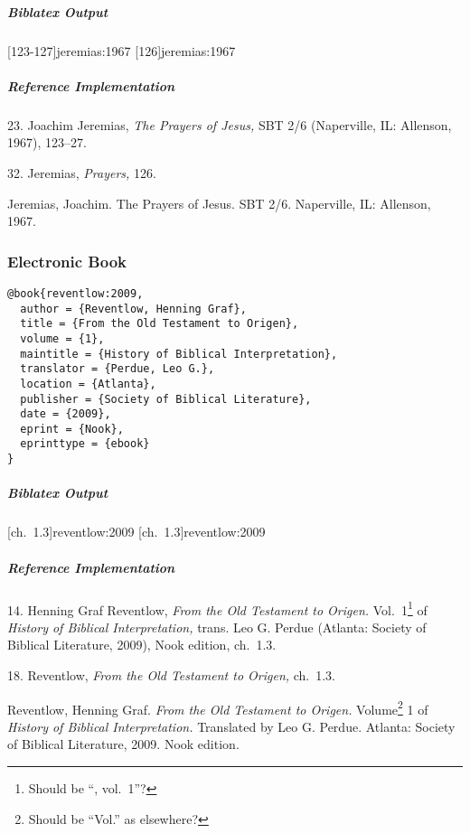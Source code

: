 \documentclass[a4paper]{article}
\newenvironment{biboutput}{%
  \subparagraph{Biblatex Output}
}{\color{black}}
\newenvironment{refimp}{%
  \subparagraph{Reference Implementation}
  \color{reference-colour}
  \rm
}{\par\color{black}}
\begin{document}
\begin{biboutput}
  [123-127]{jeremias:1967}
  [126]{jeremias:1967}
\end{biboutput}

\begin{refimp}
  23. Joachim Jeremias, \emph{The Prayers of Jesus,} SBT 2/6 (Naperville, IL:
  Allenson, 1967), 123–27.

  32. Jeremias, \emph{Prayers,} 126.

  \hangindent\bibindent Jeremias, Joachim. The Prayers of Jesus. SBT 2/6.
  Naperville, IL: Allenson, 1967.

\end{refimp}

\subsubsection{Electronic Book}

\begin{lstlisting}
@book{reventlow:2009,
  author = {Reventlow, Henning Graf},
  title = {From the Old Testament to Origen},
  volume = {1},
  maintitle = {History of Biblical Interpretation},
  translator = {Perdue, Leo G.},
  location = {Atlanta},
  publisher = {Society of Biblical Literature},
  date = {2009},
  eprint = {Nook},
  eprinttype = {ebook}
}
\end{lstlisting}

\begin{biboutput}
  [ch.~1.3]{reventlow:2009}
  [ch.~1.3]{reventlow:2009}
\end{biboutput}

\begin{refimp}
  14. Henning Graf Reventlow, \emph{From the Old Testament to Origen.}
  Vol.~1\footnote{Should be “, vol.~1”?} of \emph{History of Biblical
  Interpretation,} trans. Leo G. Perdue (Atlanta: Society of Biblical
  Literature, 2009), Nook edition, ch.~1.3.

  18. Reventlow, \emph{From the Old Testament to Origen,} ch.~1.3.
  
  \hangindent\bibindent Reventlow, Henning Graf. \emph{From the Old Testament
  to Origen.} Volume\footnote{Should be “Vol.” as elsewhere?} 1 of
  \emph{History of Biblical Interpretation.} Translated by Leo G. Perdue.
  Atlanta: Society of Biblical Literature, 2009. Nook edition.
\end{refimp}
\end{document}
